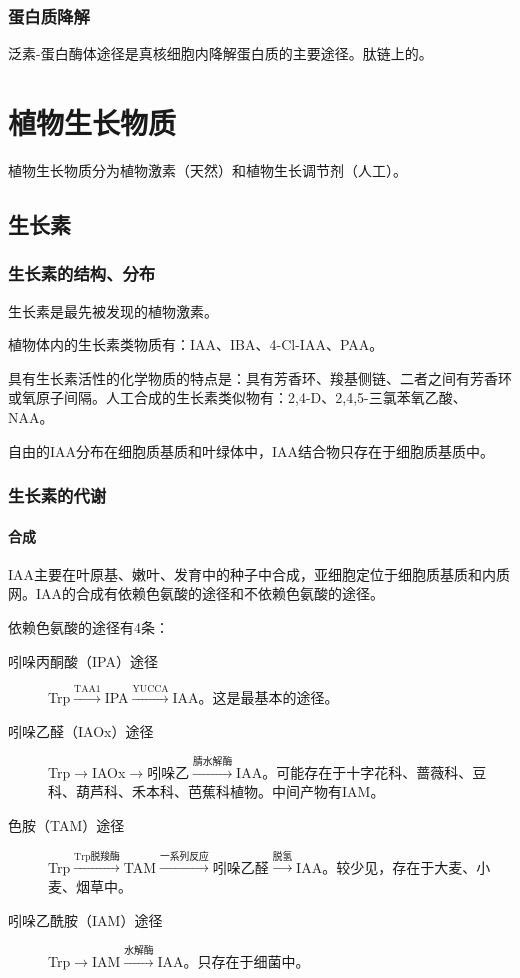 \subsubsection{蛋白质降解}

泛素-蛋白酶体途径是真核细胞内降解蛋白质的主要途径。肽链上的。

\section{植物生长物质}

植物生长物质分为植物激素（天然）和植物生长调节剂（人工）。

\subsection{生长素}

\subsubsection{生长素的结构、分布}

生长素是最先被发现的植物激素。

植物体内的生长素类物质有：IAA、IBA、4-Cl-IAA、PAA。

具有生长素活性的化学物质的特点是：具有芳香环、羧基侧链、二者之间有芳香环或氧原子间隔。人工合成的生长素类似物有：2,4-D、2,4,5-三氯苯氧乙酸、NAA。

自由的IAA分布在细胞质基质和叶绿体中，IAA结合物只存在于细胞质基质中。
\subsubsection{生长素的代谢}

\paragraph{合成}

IAA主要在叶原基、嫩叶、发育中的种子中合成，亚细胞定位于细胞质基质和内质网。IAA的合成有依赖色氨酸的途径和不依赖色氨酸的途径。

依赖色氨酸的途径有4条：

\begin{description}
	\item[吲哚丙酮酸（IPA）途径] Trp$\xrightarrow{\text{TAA1}}$IPA$\xrightarrow{\text{YUCCA}}$IAA。这是最基本的途径。
	\item[吲哚乙醛（IAOx）途径] Trp$\longrightarrow$IAOx$\longrightarrow$吲哚乙$\xrightarrow{\text{腈水解酶}}$IAA。可能存在于十字花科、蔷薇科、豆科、葫芦科、禾本科、芭蕉科植物。中间产物有IAM。
	\item[色胺（TAM）途径] Trp$\xrightarrow{\text{Trp脱羧酶}}$TAM$\xrightarrow{\text{一系列反应}}$吲哚乙醛$\xrightarrow{\text{脱氢}}$IAA。较少见，存在于大麦、小麦、烟草中。
	\item[吲哚乙酰胺（IAM）途径] Trp$\longrightarrow$IAM$\xrightarrow{\text{水解酶}}$IAA。只存在于细菌中。
\end{description}

